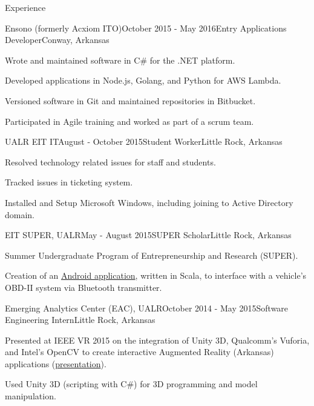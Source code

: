\documentclass{resume} %
\begin{document}
\begin{rSection}{Experience}
\begin{rSubsection}{Ensono (formerly Acxiom ITO)}{October 2015 - May 2016}{Entry Applications Developer}{Conway, Arkansas}

	\item Wrote and maintained software in C\# for the .NET platform.
	\item Developed applications in Node.js, Golang, and Python for AWS Lambda.
	\item Versioned software in Git and maintained repositories in Bitbucket.
	\item Participated in Agile training and worked as part of a scrum team.
\end{rSubsection}

\begin{rSubsection}{UALR EIT IT}{August - October 2015}{Student Worker}{Little Rock, Arkansas}

	\item Resolved technology related issues for staff and students.
	\item Tracked issues in ticketing system.
	\item Installed and Setup Microsoft Windows, including joining to Active Directory domain.
\end{rSubsection}

\begin{rSubsection}{EIT SUPER, UALR}{May - August 2015}{SUPER Scholar}{Little Rock, Arkansas}

	\item Summer Undergraduate Program of Entrepreneurship and Research (SUPER).
	\item Creation of an \href{http://github.com/cptaffe/flamethrower}{Android application}, written in Scala, to interface with a vehicle's OBD-II system via Bluetooth transmitter.
\end{rSubsection}

\begin{rSubsection}{Emerging Analytics Center (EAC), UALR}{October 2014 - May 2015}{Software Engineering Intern}{Little Rock, Arkansas}
	\item Presented at IEEE VR 2015 on the integration of Unity 3D, Qualcomm's Vuforia, and Intel's OpenCV to create interactive Augmented Reality (Arkansas) applications (\href{http://byteflame.org/ieee_vr/}{presentation}{}).
	\item Used Unity 3D (scripting with C\#) for 3D programming and model manipulation.
\end{rSubsection}

%

\end{rSection}
\end{document}
